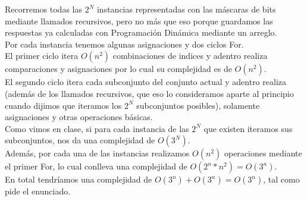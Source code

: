 Recorremos todas las $2^N$ instancias representadas con las máscaras de bits mediante llamados recursivos, pero no más que eso porque guardamos las respuestas ya calculadas con Programación Dinámica mediante un arreglo. \\
Por cada instancia tenemos algunas asignaciones y dos ciclos For.\\
El primer ciclo itera $O(n^2)$ combinaciones de indices y adentro realiza comparaciones y asignaciones por lo cual su complejidad es de $O(n^2)$. \\
El segundo ciclo itera cada subconjunto del conjunto actual y adentro realiza (además de los llamados recursivos, que eso lo consideramos aparte al principio cuando dijimos que iteramos los $2^N$ subconjuntos posibles), solamente asignaciones y otras operaciones básicas. \\
Como vimos en clase, si para cada instancia de las $2^N$ que existen iteramos sus subconjuntos, nos da una complejidad de $O(3^N)$.\\
Además, por cada una de las instancias realizamos $O(n^2)$ operaciones mediante el primer For, lo cual conlleva una complejidad de $O(2^n * n^2) = O(3^n)$. \\
En total tendríamos una complejidad de $O(3^n) + O(3^n) = O(3^n)$, tal como pide el enunciado.

